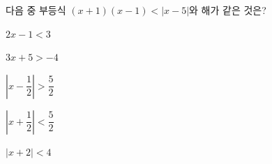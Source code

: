 다음 중 부등식 $(x+1)(x-1)<|x-5|$와 해가 같은 것은?
\begin{choicesii}{\rule[-3ex]{0pt}{8ex}$2x-1<3$}{\rule[-3ex]{0pt}{8ex}$3x+5>-4$}{\rule[-3ex]{0pt}{8ex}$\left|x-\dfrac{1}{2}\right|>\dfrac{5}{2}$}{\rule[-3ex]{0pt}{8ex}$\left|x+\dfrac{1}{2}\right|<\dfrac{5}{2}$}{\rule[-3ex]{0pt}{8ex}$|x+2|<4$}\end{choicesii}
